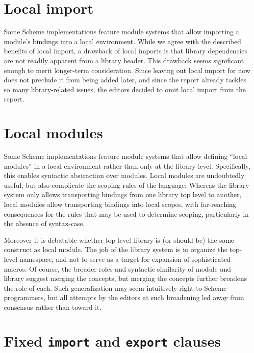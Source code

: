 \documentclass[twoside,twocolumn]{algol60}
\begin{document}
\section{Local import}

Some Scheme implementations feature module systems that allow
importing a module's bindings into a local environment.  While we
agree with the described benefits of local import, a drawback of local
imports is that library dependencies are not readily apparent from a
library header. This drawback seems significant enough to merit
longer-term consideration. Since leaving out local import for now does
not preclude it from being added later, and since the report already
tackles so many library-related issues, the editors decided to omit
local import from the report.

\section{Local modules}

Some Scheme implementations feature module systems that allow defining
``local modules'' in a local environment rather than only at the
library level.  Specifically, this enables syntactic abstraction over
modules.  Local modules are undoubtedly useful, but also complicate
the scoping rules of the language: Whereas the library system only
allows transporting bindings from one library top level to another,
local modules allow transporting bindings into local scopes, with
far-reaching consequences for the rules that may be used to determine
scoping, particularly in the absence of {\cf syntax-case}.

Moreover it is debatable whether top-level {\cf library} is (or should
be) the same construct as local {\cf module}. The job of the library
system is to organize the top-level namespace, and not to serve as a
target for expansion of sophisticated macros. Of course, the broader
roles and syntactic similarity of {\cf module} and {\cf library}
suggest merging the concepts, but merging the concepts further
broadens the role of each.  Such generalization may seem intuitively
right to Scheme programmers, but all attempts by the editors at such
broadening led away from consensus rather than toward it.

\section{Fixed {\tt import} and {\tt export} clauses}
\end{document}
